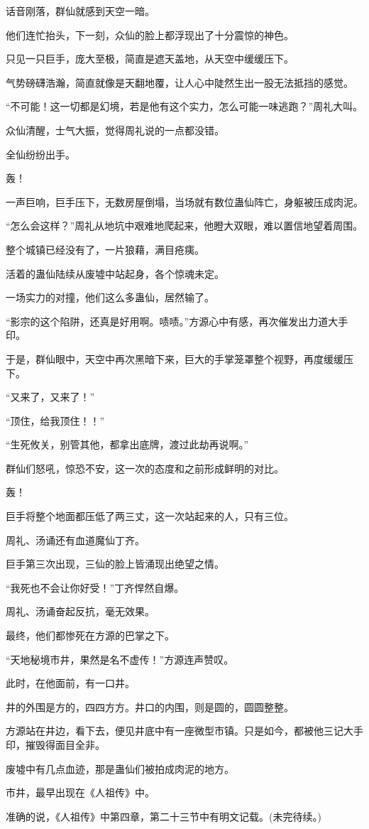 \begin{this_body}
话音刚落，群仙就感到天空一暗。

他们连忙抬头，下一刻，众仙的脸上都浮现出了十分震惊的神色。

只见一只巨手，庞大至极，简直是遮天盖地，从天空中缓缓压下。

气势磅礴浩瀚，简直就像是天翻地覆，让人心中陡然生出一股无法抵挡的感觉。

“不可能！这一切都是幻境，若是他有这个实力，怎么可能一味逃跑？”周礼大叫。

众仙清醒，士气大振，觉得周礼说的一点都没错。

全仙纷纷出手。

轰！

一声巨响，巨手压下，无数房屋倒塌，当场就有数位蛊仙阵亡，身躯被压成肉泥。

“怎么会这样？”周礼从地坑中艰难地爬起来，他瞪大双眼，难以置信地望着周围。

整个城镇已经没有了，一片狼藉，满目疮痍。

活着的蛊仙陆续从废墟中站起身，各个惊魂未定。

一场实力的对撞，他们这么多蛊仙，居然输了。

“影宗的这个陷阱，还真是好用啊。啧啧。”方源心中有感，再次催发出力道大手印。

于是，群仙眼中，天空中再次黑暗下来，巨大的手掌笼罩整个视野，再度缓缓压下。

“又来了，又来了！”

“顶住，给我顶住！！”

“生死攸关，别管其他，都拿出底牌，渡过此劫再说啊。”

群仙们怒吼，惊恐不安，这一次的态度和之前形成鲜明的对比。

轰！

巨手将整个地面都压低了两三丈，这一次站起来的人，只有三位。

周礼、汤诵还有血道魔仙丁齐。

巨手第三次出现，三仙的脸上皆涌现出绝望之情。

“我死也不会让你好受！”丁齐悍然自爆。

周礼、汤诵奋起反抗，毫无效果。

最终，他们都惨死在方源的巴掌之下。

“天地秘境市井，果然是名不虚传！”方源连声赞叹。

此时，在他面前，有一口井。

井的外围是方的，四四方方。井口的内围，则是圆的，圆圆整整。

方源站在井边，看下去，便见井底中有一座微型市镇。只是如今，都被他三记大手印，摧毁得面目全非。

废墟中有几点血迹，那是蛊仙们被拍成肉泥的地方。

市井，最早出现在《人祖传》中。

准确的说，《人祖传》中第四章，第二十三节中有明文记载。(未完待续。)

\end{this_body}

